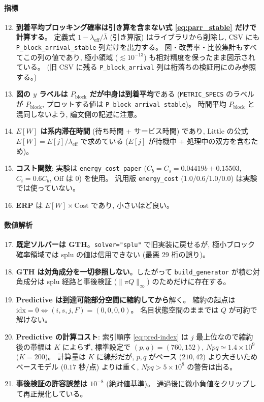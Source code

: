 \documentclass[a4paper,11pt]{article}
\newcommand{\code}[1]{\texttt{#1}}
\newcommand{\eff}{\mathrm{eff}}
\newcommand{\blk}{\mathrm{block}}
\begin{document}
\paragraph{指標}
\begin{enumerate}\setcounter{enumi}{11}
\item \textbf{到着平均ブロッキング確率は引き算を含まない式 \eqref{eq:parr_stable} だけで計算する}。
      定義式 $1-\lambda_\eff/\bar\lambda$ (引き算版) はライブラリから削除し,
      CSV にも \code{P\_block\_arrival\_stable} 列だけを出力する。
      図・改善率・比較集計もすべてこの列の値であり,
      極小領域 ($\lesssim10^{-13}$) も相対精度を保ったまま図示されている。
      (旧 CSV に残る \code{P\_block\_arrival} 列は桁落ちの検証用にのみ参照する。)
\item \textbf{図の $y$ ラベルは $P_{\blk}$ だが中身は到着平均}である
      (\code{METRIC\_SPECS} のラベルが $P_{\mathrm{block}}$,
      プロットする値は \code{P\_block\_arrival\_stable})。
      時間平均 $P_\blk$ と混同しないよう, 論文側の記述に注意。
\item \textbf{$E[W]$ は系内滞在時間} (待ち時間 + サービス時間) であり,
      Little の公式 $E[W]=E[j]/\lambda_\eff$ で求めている
      ($E[j]$ が待機中 + 処理中の双方を含むため)。
\item \textbf{コスト関数}: 実験は \code{energy\_cost\_paper}
      ($C_b=C_s=0.04419b+0.15503$, $C_i=0.6C_b$, Off は $0$) を使用。
      汎用版 \code{energy\_cost} ($1.0/0.6/1.0/0.0$) は実験では使っていない。
\item \textbf{ERP} は $E[W]\times\mathrm{Cost}$ であり, 小さいほど良い。
\end{enumerate}

\paragraph{数値解析}
\begin{enumerate}\setcounter{enumi}{16}
\item \textbf{既定ソルバーは GTH}。\code{solver="splu"} で旧実装に戻せるが,
      極小ブロック確率領域では splu の値は信用できない (最悪 29 桁の誤り)。
\item \textbf{GTH は対角成分を一切参照しない}。したがって
      \code{build\_generator} が積む対角成分は splu 経路と事後検証
      ($\|\pi Q\|_\infty$) のためだけに存在する。
\item \textbf{Predictive は到達可能部分空間に縮約してから}解く。
      縮約の起点は $\mathrm{idx}=0\Leftrightarrow(i,s,j,F)=(0,0,0,0)$。
      名目状態空間のままでは $Q$ が可約で解けない。
\item \textbf{Predictive の計算コスト}: 索引順序 \eqref{eq:pred-index} は
      $j$ 最上位なので縮約後の帯幅は $K$ によらず, 標準設定で
      $(p,q)=(760,152)$, $Npq\simeq1.4\times10^9$ ($K=200$)。
      計算量は $K$ に線形だが, $p,q$ がベース ($210, 42$) より大きいため
      ベースモデル ($0.17$ 秒/点) よりは重く, $Npq>5\times10^8$ の警告は出る。
\item \textbf{事後検証の許容誤差は $10^{-8}$} (絶対値基準)。
      通過後に微小負値をクリップして再正規化している。
\end{enumerate}
\end{document}
